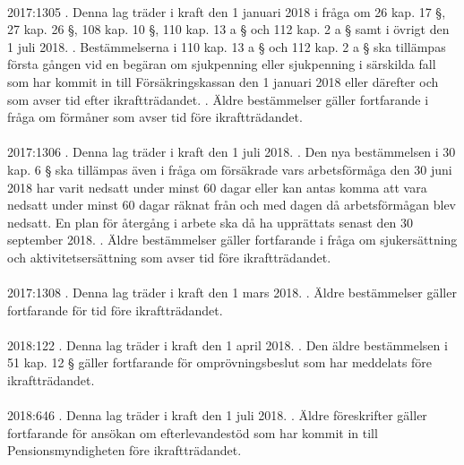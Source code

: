 \documentclass[a4paper,notitlepage,openany,10pt]{book}
\begin{document}
\paragraph*{}
2017:1305
. Denna lag träder i kraft den 1 januari 2018 i fråga om 26 kap. 17 §, 27 kap. 26 §, 108 kap. 10 §, 110 kap. 13 a § och 112 kap. 2 a § samt i övrigt den 1 juli 2018.
. Bestämmelserna i 110 kap. 13 a § och 112 kap. 2 a § ska tillämpas första gången vid en begäran om sjukpenning eller sjukpenning i särskilda fall som har kommit in till Försäkringskassan den 1 januari 2018 eller därefter och som avser tid efter ikraftträdandet.
. Äldre bestämmelser gäller fortfarande i fråga om förmåner som avser tid före ikraftträdandet.
\paragraph*{}
2017:1306
. Denna lag träder i kraft den 1 juli 2018.
. Den nya bestämmelsen i 30 kap. 6 § ska tillämpas även i fråga om försäkrade vars arbetsförmåga den 30 juni 2018 har varit nedsatt under minst 60 dagar eller kan antas komma att vara nedsatt under minst 60 dagar räknat från och med dagen då arbetsförmågan blev nedsatt. En plan för återgång i arbete ska då ha upprättats senast den 30 september 2018.
. Äldre bestämmelser gäller fortfarande i fråga om sjukersättning och aktivitetsersättning som avser tid före ikraftträdandet.
\paragraph*{}
2017:1308
. Denna lag träder i kraft den 1 mars 2018.
. Äldre bestämmelser gäller fortfarande för tid före ikraftträdandet.
\paragraph*{}
2018:122
. Denna lag träder i kraft den 1 april 2018.
. Den äldre bestämmelsen i 51 kap. 12 § gäller fortfarande för omprövningsbeslut som har meddelats före ikraftträdandet.
\paragraph*{}
2018:646
. Denna lag träder i kraft den 1 juli 2018.
. Äldre föreskrifter gäller fortfarande för ansökan om efterlevandestöd som har kommit in till Pensionsmyndigheten före ikraftträdandet.
\end{document}
